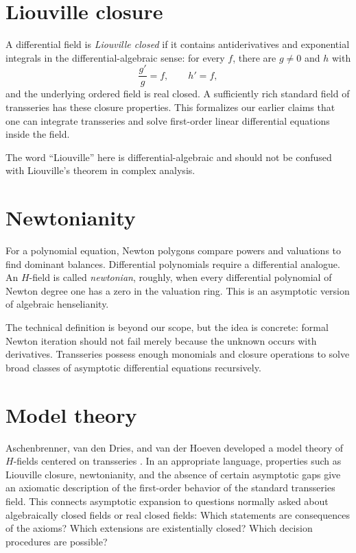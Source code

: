 \documentclass[11pt,oneside]{book}
\theoremstyle{definition}
\theoremstyle{remark}
\begin{document}
\section{Liouville closure}

A differential field is \emph{Liouville closed} if it contains antiderivatives
and exponential integrals in the differential-algebraic sense: for every $f$,
there are $g\ne0$ and $h$ with
\[
  \frac{g'}g=f,
  \qquad h'=f,
\]
and the underlying ordered field is real closed. A sufficiently rich standard
field of transseries has these closure properties. This formalizes our earlier
claims that one can integrate transseries and solve first-order linear
differential equations inside the field.

The word ``Liouville'' here is differential-algebraic and should not be confused
with Liouville's theorem in complex analysis.

\section{Newtonianity}

For a polynomial equation, Newton polygons compare powers and valuations to find
dominant balances. Differential polynomials require a differential analogue.
An $H$-field is called \emph{newtonian}, roughly, when every differential
polynomial of Newton degree one has a zero in the valuation ring. This is an
asymptotic version of algebraic henselianity.

The technical definition is beyond our scope, but the idea is concrete:
formal Newton iteration should not fail merely because the unknown occurs with
derivatives. Transseries possess enough monomials and closure operations to
solve broad classes of asymptotic differential equations recursively.

\section{Model theory}

Aschenbrenner, van den Dries, and van der Hoeven developed a model theory of
$H$-fields centered on transseries \cite{ADHBook}. In an appropriate language,
properties such as Liouville closure, newtonianity, and the absence of certain
asymptotic gaps give an axiomatic description of the first-order behavior of the
standard transseries field. This connects asymptotic expansion to questions
normally asked about algebraically closed fields or real closed fields:
Which statements are consequences of the axioms? Which extensions are
existentially closed? Which decision procedures are possible?
\end{document}
